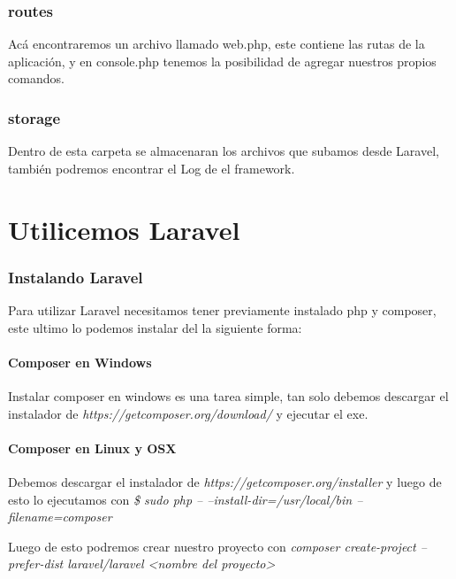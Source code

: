 \documentclass[spanish]{theme/pclreport}
\begin{document}
\subsection{routes}
Acá encontraremos un archivo llamado web.php, este contiene las rutas de la aplicación, y en console.php tenemos la posibilidad de agregar nuestros propios comandos.

\subsection{storage}
Dentro de esta carpeta se almacenaran los archivos que subamos desde Laravel, también podremos encontrar el Log de el framework.







\chapter{Utilicemos Laravel}

\subsection{Instalando Laravel}
Para utilizar Laravel necesitamos tener previamente instalado php y composer, este ultimo lo podemos instalar del la siguiente forma:

\subsubsection{Composer en Windows}
Instalar composer en windows es una tarea simple, tan solo debemos descargar el instalador de \newline
 \textit{https://getcomposer.org/download/} y ejecutar el exe.
 
\subsubsection{Composer en Linux y OSX}
Debemos descargar el instalador de \textit{https://getcomposer.org/installer} y luego de esto lo ejecutamos con
\textit{\$ sudo php -- --install-dir=/usr/local/bin --filename=composer}  \newline

Luego de esto podremos crear nuestro proyecto con \newline \textit{composer create-project --prefer-dist laravel/laravel \textless nombre del proyecto\textgreater}
\end{document}
